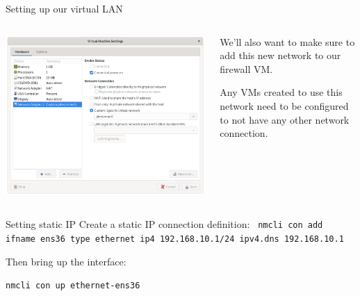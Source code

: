 \documentclass[bigger,aspectratio=169]{beamer}
\begin{document}
\begin{frame}{Setting up our virtual LAN}
  \begin{columns}
    \begin{column}{.45\textwidth}
      \vfill
      \includegraphics[width=\linewidth]{./assets/router-vm-network-settings.png}
      \vfill
    \end{column}
    \begin{column}{.45\textwidth}
      \vfill
      We'll also want to make sure to add this new network to our firewall VM.

      Any VMs created to use this network need to be configured to not have any
      other network connection.
      \vfill
    \end{column}
  \end{columns}
\end{frame}

\begin{frame}{Setting static IP}
  Create a static IP connection definition:
\texttt{
nmcli con add ifname ens36
      type ethernet ip4 192.168.10.1/24
      ipv4.dns 192.168.10.1}
\vfill

Then bring up the interface:

\texttt{nmcli con up ethernet-ens36}

\end{frame}
\end{document}
